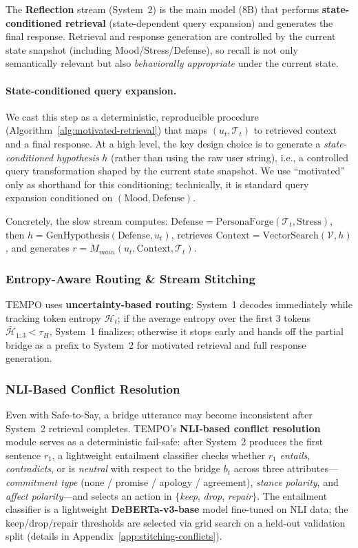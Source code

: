 \documentclass[11pt]{article}
\begin{document}
The \textbf{Reflection} stream (System~2) is the main model (8B) that performs \textbf{state-conditioned retrieval} (state-dependent query expansion) and generates the final response.
Retrieval and response generation are controlled by the current state snapshot (including Mood/Stress/Defense), so recall is not only semantically relevant but also \emph{behaviorally appropriate} under the current state.

\paragraph{State-conditioned query expansion.}
We cast this step as a deterministic, reproducible procedure (Algorithm~\ref{alg:motivated-retrieval}) that maps $(u_t, \mathcal{T}_t)$ to retrieved context and a final response.
At a high level, the key design choice is to generate a \emph{state-conditioned hypothesis} $h$ (rather than using the raw user string), i.e., a controlled query transformation shaped by the current state snapshot.
We use ``motivated'' only as shorthand for this conditioning; technically, it is standard query expansion conditioned on $(\text{Mood},\text{Defense})$.

Concretely, the slow stream computes: $\text{Defense} = \text{PersonaForge}(\mathcal{T}_t, \text{Stress})$\label{eq:defense}, then $h = \text{GenHypothesis}(\text{Defense}, u_t)$, retrieves $\text{Context} = \text{VectorSearch}(\mathcal{V}, h)$, and generates $r = M_{main}(u_t, \text{Context}, \mathcal{T}_t)$.

\subsubsection{Entropy-Aware Routing \& Stream Stitching}
TEMPO uses \textbf{uncertainty-based routing}: System~1 decodes immediately while tracking token entropy $\mathcal{H}_t$; if the average entropy over the first 3 tokens $\bar{\mathcal{H}}_{1:3} < \tau_H$, System~1 finalizes; otherwise it stops early and hands off the partial bridge as a prefix to System~2 for motivated retrieval and full response generation.
\subsubsection{NLI-Based Conflict Resolution}
\label{sec:nli-stitching}

Even with Safe-to-Say, a bridge utterance may become inconsistent after System~2 retrieval completes.
TEMPO's \textbf{NLI-based conflict resolution} module serves as a deterministic fail-safe: after System~2 produces the first sentence $r_1$, a lightweight entailment classifier checks whether $r_1$ \emph{entails}, \emph{contradicts}, or is \emph{neutral} with respect to the bridge $b_t$ across three attributes---\textit{commitment type} (none / promise / apology / agreement), \textit{stance polarity}, and \textit{affect polarity}---and selects an action in $\{$\emph{keep}, \emph{drop}, \emph{repair}$\}$.
The entailment classifier is a lightweight \textbf{DeBERTa-v3-base} model fine-tuned on NLI data; the keep/drop/repair thresholds are selected via grid search on a held-out validation split (details in Appendix~\ref{app:stitching-conflicts}).
\end{document}
